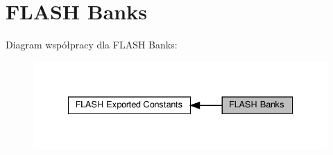 \hypertarget{group___f_l_a_s_h_ex___banks}{}\section{F\+L\+A\+SH Banks}
\label{group___f_l_a_s_h_ex___banks}
Diagram współpracy dla F\+L\+A\+SH Banks\+:\nopagebreak
\begin{figure}[H]
\begin{center}
\leavevmode
\includegraphics[width=335pt]{group___f_l_a_s_h_ex___banks}
\end{center}
\end{figure}
